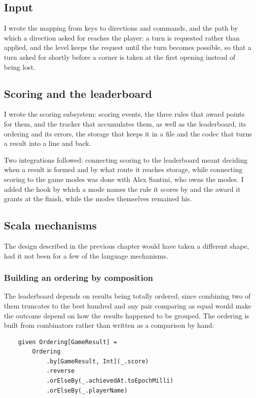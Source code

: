 \subsection{Input}

I wrote the mapping from keys to directions and commands, and the path by which a direction asked for reaches the
player: a turn is requested rather than applied, and the level keeps the request until the turn becomes possible,
so that a turn asked for shortly before a corner is taken at the first opening instead of being lost.

\subsection{Scoring and the leaderboard}

I wrote the scoring subsystem: scoring events, the three rules that award points for them, and the tracker that
accumulates them, as well as the leaderboard, its ordering and its errors, the storage that keeps it in a file
and the codec that turns a result into a line and back.

Two integrations followed: connecting scoring to the leaderboard meant deciding when a result is formed and by what
route it reaches storage, while connecting scoring to the game modes was done with Alex Santini, who owns the modes.
I added the hook by which a mode names the rule it scores by and the award it grants at the finish, while the modes
themselves remained his.

\subsection{Scala mechanisms}

The design described in the previous chapter would have taken a different shape, had it not been for a few of the
language mechanisms.

\subsubsection{Building an ordering by composition}

The leaderboard depends on results being totally ordered, since combining two of them truncates to the best hundred
and any pair comparing as equal would make the outcome depend on how the results happened to be grouped. The
ordering is built from combinators rather than written as a comparison by hand:

\begin{lstlisting}
    given Ordering[GameResult] =
        Ordering
            .by[GameResult, Int](_.score)
            .reverse
            .orElseBy(_.achievedAt.toEpochMilli)
            .orElseBy(_.playerName)
\end{lstlisting}

